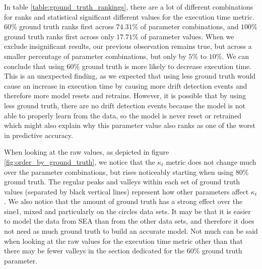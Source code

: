 In table \ref{table:ground_truth_rankings}, there are a lot of different combinations for ranks and statistical significant different values for the execution time metric. $60\%$ ground truth ranks first across $74.31\%$ of parameter combinations, and $100\%$ ground truth ranks first across only $17.71\%$ of parameter values. When we exclude insignificant results, our previous observation remains true, but across a smaller percentage of parameter combinations, but only by $5\%$ to $10\%$. We can conclude that using $60\%$ ground truth is more likely to decrease execution time. This is an unexpected finding, as we expected that using less ground truth would cause an increase in execution time by causing more drift detection events and therefore more model resets and retrains. However, it is possible that by using less ground truth, there are no drift detection events because the model is not able to properly learn from the data, so the model is never reset or retrained which might also explain why this parameter value also ranks as one of the worst in predictive accuracy.

When looking at the raw values, as depicted in figure \ref{fig:order_by_ground_truth}, we notice that the $\kappa_t$ metric does not change much over the parameter combinations, but rises noticeably starting when using $80\%$ ground truth. The regular peaks and valleys within each set of ground truth values (separated by black vertical lines) represent how other parameters affect $\kappa_t$. We also notice that the amount of ground truth has a strong effect over the sine1, mixed and particularly on the circles data sets. It may be that it is easier to model the data from SEA than from the other data sets, and therefore it does not need as much ground truth to build an accurate model. Not much can be said when looking at the raw values for the execution time metric other than that there may be fewer valleys in the section dedicated for the $60\%$ ground truth parameter.

